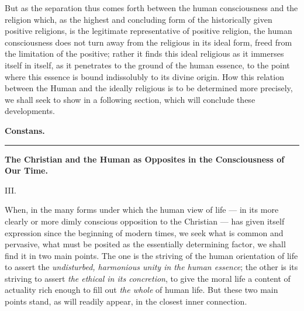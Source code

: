 \documentclass[12pt,a4paper,openany]{book}
\newcommand{\secnum}[1]{\par\begin{center}#1\end{center}\par\nobreak}
\newcommand{\opage}[1]{\marginnote{\footnotesize\textit{[#1]}}}
\begin{document}
But as the separation thus comes forth between the
human consciousness and the religion which, as the highest and concluding form
of the historically given positive religions, is
the legitimate representative of positive religion, the
human consciousness does not turn away from the religious in its ideal form,
freed from the limitation of the positive; rather it
finds this ideal religious as it immerses itself in itself,
as it penetrates to the ground of the human essence, to
the point where this essence is bound indissolubly to its divine
origin. How this relation between the Human
and the ideally religious is to be determined more precisely, we shall
seek to show in a following section, which will conclude these developments.

\begin{flushright}\textbf{Constans.}\end{flushright}
\begin{center}\rule{2.6cm}{0.4pt}\end{center}

\clearpage
\opage{492}\begin{center}\textbf{\large The Christian and the Human as Opposites in the Consciousness of Our Time.}\end{center}

\secnum{III.}

When, in the many forms under which the human view of life
--- in its more clearly or more dimly conscious opposition
to the Christian --- has given itself expression since the
beginning of modern times, we seek what is common and pervasive,
what must be posited as the essentially determining factor, we
shall find it in two main points. The one is the striving of the
human orientation of life to assert the \emph{undisturbed, harmonious
unity in the human essence}; the other is its striving to
assert \emph{the ethical in its concretion}, to give the moral
life a content of actuality rich enough to fill out \emph{the whole}
of human life. But these two main points stand, as will readily
appear, in the closest inner connection.
\end{document}
